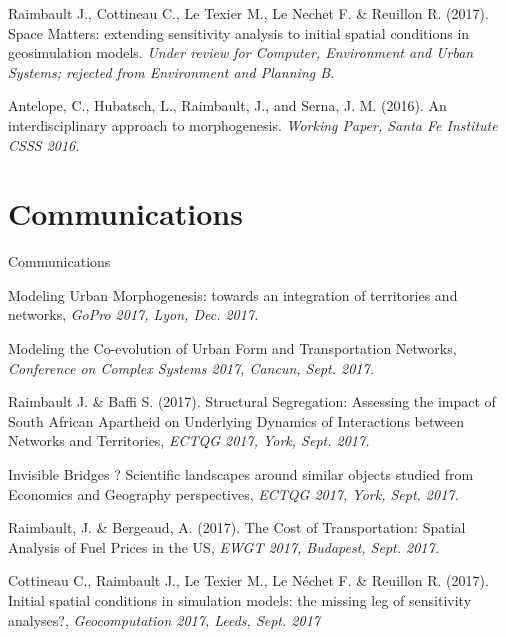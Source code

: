 \bigskip

\noindent Raimbault J., Cottineau C., Le Texier M., Le Nechet F. \& Reuillon R.
 (2017). Space Matters: extending sensitivity analysis to initial spatial conditions in geosimulation models. \textit{Under review for Computer, Environment and Urban Systems; rejected from Environment and Planning B.}

\bigskip

\noindent Antelope, C., Hubatsch, L., Raimbault, J., and Serna, J. M. (2016). An interdisciplinary approach to morphogenesis. \textit{Working Paper, Santa Fe Institute CSSS 2016.}





\section*{Communications}{Communications}



\noindent Modeling Urban Morphogenesis: towards an integration of territories and networks, \textit{GoPro 2017, Lyon, Dec. 2017.}


\bigskip


\noindent Modeling the Co-evolution of Urban Form and Transportation Networks, \textit{Conference on Complex Systems 2017, Cancun, Sept. 2017.}

\bigskip

\noindent Raimbault J. \& Baffi S. (2017). Structural Segregation: Assessing the impact of South African Apartheid on Underlying Dynamics of Interactions between Networks and Territories, \textit{ECTQG 2017, York, Sept. 2017.}


\bigskip


\noindent Invisible Bridges ? Scientific landscapes around similar objects studied from Economics and Geography perspectives, \textit{ECTQG 2017, York, Sept. 2017.}


\bigskip


\noindent Raimbault, J. \& Bergeaud, A. (2017). The Cost of Transportation: Spatial Analysis of Fuel Prices in the US, \textit{EWGT 2017, Budapest, Sept. 2017.}

\bigskip


\noindent Cottineau C., Raimbault J., Le Texier M., Le N{\'e}chet F. \& Reuillon R. (2017). Initial spatial conditions in simulation models: the missing leg of sensitivity analyses?, \textit{Geocomputation 2017, Leeds, Sept. 2017}

\bigskip


